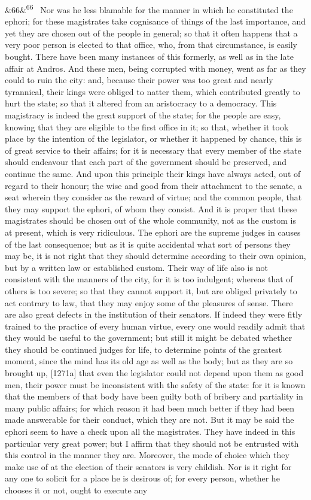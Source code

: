 \documentclass[12pt]{article}
\newcommand{\para}[1][]{\par\noindent\ifx&#1&\else\textsuperscript{\footnotesize #1}~\fi}
\begin{document}
\para[66] Nor was he less blamable for the manner in which he constituted the ephori; for these magistrates take cognisance of things of the last importance, and yet they are chosen out of the people in general; so that it often happens that a very poor person is elected to that office, who, from that circumstance, is easily bought. There have been many instances of this formerly, as well as in the late affair at Andros. And these men, being corrupted with money, went as far as they could to ruin the city: and, because their power was too great and nearly tyrannical, their kings were obliged to natter them, which contributed greatly to hurt the state; so that it altered from an aristocracy to a democracy. This magistracy is indeed the great support of the state; for the people are easy, knowing that they are eligible to the first office in it; so that, whether it took place by the intention of the legislator, or whether it happened by chance, this is of great service to their affairs; for it is necessary that every member of the state should endeavour that each part of the government should be preserved, and continue the same. And upon this principle their kings have always acted, out of regard to their honour; the wise and good from their attachment to the senate, a seat wherein they consider as the reward of virtue; and the common people, that they may support the ephori, of whom they consist. And it is proper that these magistrates should be chosen out of the whole community, not as the custom is at present, which is very ridiculous. The ephori are the supreme judges in causes of the last consequence; but as it is quite accidental what sort of persons they may be, it is not right that they should determine according to their own opinion, but by a written law or established custom. Their way of life also is not consistent with the manners of the city, for it is too indulgent; whereas that of others is too severe; so that they cannot support it, but are obliged privately to act contrary to law, that they may enjoy some of the pleasures of sense. There are also great defects in the institution of their senators. If indeed they were fitly trained to the practice of every human virtue, every one would readily admit that they would be useful to the government; but still it might be debated whether they should be continued judges for life, to determine points of the greatest moment, since the mind has its old age as well as the body; but as they are so brought up, [1271a] that even the legislator could not depend upon them as good men, their power must be inconsistent with the safety of the state: for it is known that the members of that body have been guilty both of bribery and partiality in many public affairs; for which reason it had been much better if they had been made answerable for their conduct, which they are not. But it may be said the ephori seem to have a check upon all the magistrates. They have indeed in this particular very great power; but I affirm that they should not be entrusted with this control in the manner they are. Moreover, the mode of choice which they make use of at the election of their senators is very childish. Nor is it right for any one to solicit for a place he is desirous of; for every person, whether he chooses it or not, ought to execute any 
\end{document}
